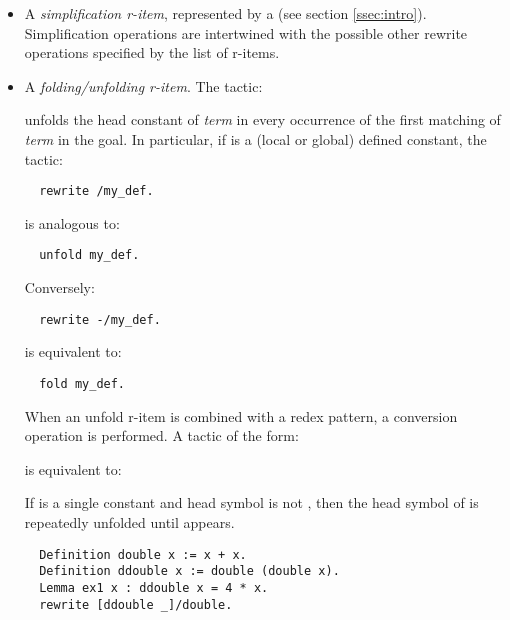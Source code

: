 \begin{itemize}
\item A \emph{simplification r-item}, represented by a
   (see section \ref{ssec:intro}).
  Simplification operations are
  intertwined with the possible other rewrite operations specified by
  the list of r-items.
\item A \emph{folding/unfolding r-item}. The tactic:


unfolds the head constant of \textit{term} in every occurrence of the
first matching of \textit{term} in the goal. In particular, if
 is a (local or global) defined constant, the tactic:
\begin{lstlisting}
  rewrite /my_def.
\end{lstlisting}
is analogous to:
\begin{lstlisting}
  unfold my_def.
\end{lstlisting}
Conversely:
\begin{lstlisting}
  rewrite -/my_def.
\end{lstlisting}
is equivalent to:
\begin{lstlisting}
  fold my_def.
\end{lstlisting}

When an unfold r-item is combined with a redex pattern, a conversion
operation is performed. A tactic of the form:

\begin{center}
  \ssrC{rewrite -[}\ssrC{]/}
\end{center}

is equivalent to:


\begin{center}
     
\end{center}


If  is a single constant and  head symbol
is not , then the head symbol of  is
repeatedly unfolded until  appears.

\begin{lstlisting}
  Definition double x := x + x.
  Definition ddouble x := double (double x).
  Lemma ex1 x : ddouble x = 4 * x.
  rewrite [ddouble _]/double.
\end{lstlisting}


\end{itemize}

